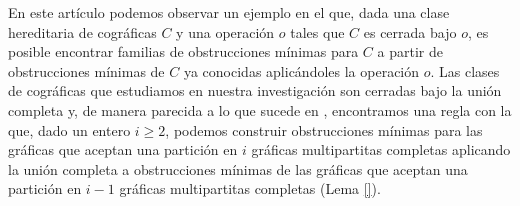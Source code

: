 En este artículo podemos observar un ejemplo en el que, dada
una clase hereditaria de cográficas $C$ y una operación
$o$ tales que $C$ es cerrada bajo $o$, es posible encontrar
familias de obstrucciones mínimas para $C$ a partir de
obstrucciones mínimas de $C$ ya conocidas aplic\'andoles
la operación $o$. Las clases de cográficas que estudiamos en
nuestra investigación son cerradas bajo la unión completa y,
de manera parecida a lo que sucede en \cite{Hell03},
encontramos una regla con la que, dado un entero $i \ge 2$, podemos construir obstrucciones mínimas para las gráficas que aceptan una partición en $i$ gráficas multipartitas completas aplicando la unión completa a obstrucciones mínimas de las gráficas que aceptan una partición en $i-1$ gráficas multipartitas completas (Lema \ref{}).


